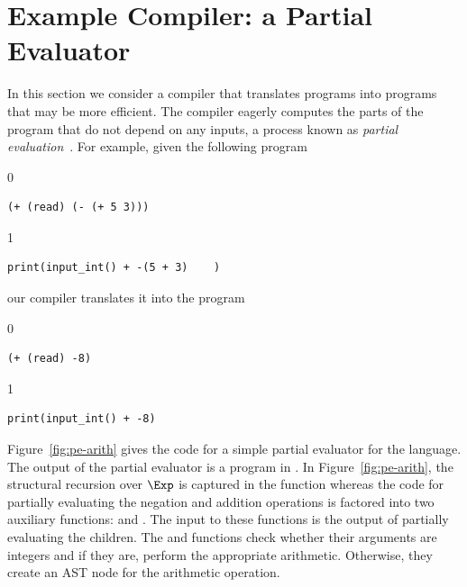\documentclass[7x10,nocrop]{TimesAPriori_MIT}%
\def\racketEd{0}
\def\pythonEd{1}
\def\edition{1}
\begin{document}
\section{Example Compiler: a Partial Evaluator}
\label{sec:partial-evaluation}

In this section we consider a compiler that translates \LangInt{}
programs into \LangInt{} programs that may be more efficient. The
compiler eagerly computes the parts of the program that do not depend
on any inputs, a process known as \emph{partial
evaluation}~\citep{Jones:1993uq}.  
For example, given the following program
{\if\edition\racketEd
\begin{lstlisting}
(+ (read) (- (+ 5 3)))
\end{lstlisting}
\fi}
{\if\edition\pythonEd
\begin{lstlisting}
print(input_int() + -(5 + 3)    )
\end{lstlisting}
\fi}
\noindent our compiler translates it into the program
{\if\edition\racketEd
\begin{lstlisting}
(+ (read) -8)
\end{lstlisting}
\fi}
{\if\edition\pythonEd
\begin{lstlisting}
print(input_int() + -8)
\end{lstlisting}
\fi}

Figure~\ref{fig:pe-arith} gives the code for a simple partial
evaluator for the \LangInt{} language. The output of the partial evaluator
is a program in \LangInt{}. In Figure~\ref{fig:pe-arith}, the structural
recursion over $\Exp$ is captured in the  function
whereas the code for partially evaluating the negation and addition
operations is factored into two auxiliary functions:
 and . The input to these 
functions is the output of partially evaluating the children.
The  and  functions check whether their
arguments are integers and if they are, perform the appropriate
arithmetic.  Otherwise, they create an AST node for the arithmetic
operation.
\end{document}

